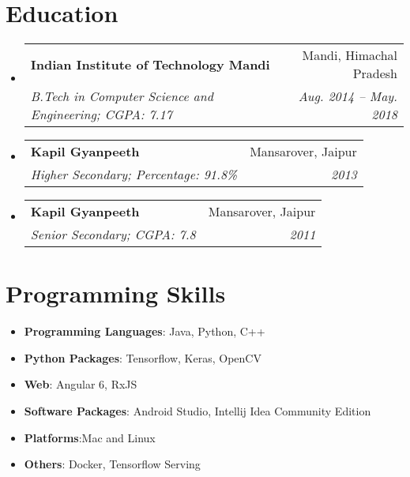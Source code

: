 \documentclass[letterpaper,11pt]{article}
\makeatletter
\newcommand{\resumeSubheading}[4]{
  \vspace{-1pt}\item
    \begin{tabular*}{0.97\textwidth}{l@{\extracolsep{\fill}}r}
      \textbf{#1} & #2 \\
      \textit{\small#3} & \textit{\small #4} \\
    \end{tabular*}\vspace{-5pt}
}
\newcommand{\resumeSubHeadingListStart}{\begin{itemize}[leftmargin=*]}
\newcommand{\resumeSubHeadingListEnd}{\end{itemize}}
\makeatother
\begin{document}
\section{Education}
  \resumeSubHeadingListStart
    \resumeSubheading
      {Indian Institute of Technology Mandi}{Mandi, Himachal Pradesh}
      {B.Tech in Computer Science and Engineering;  CGPA: 7.17}{Aug. 2014 -- May. 2018}
    \resumeSubheading
      {Kapil Gyanpeeth}{Mansarover, Jaipur}
      {Higher Secondary;  Percentage: 91.8\% }{2013}
    \resumeSubheading
      {Kapil Gyanpeeth}{Mansarover, Jaipur}
      {Senior Secondary;  CGPA: 7.8 }{2011}
  \resumeSubHeadingListEnd
  
\section{Programming Skills}
 \resumeSubHeadingListStart
    \item{
     \textbf{Programming Languages}{: Java, Python, C++}
     \hfill
    }
    \item{
      \textbf{Python Packages}{: Tensorflow, Keras, OpenCV}
      \hfill
    }
    \item{
       \textbf{Web}{: Angular 6, RxJS}
      \hfill
    }
    \item{
      \textbf{Software Packages}{: Android Studio, Intellij Idea Community Edition}
      \hfill
    }
    \item{
      \textbf{Platforms}{:Mac and Linux}
      \hfill
    }
    \item{
    \textbf{Others}{: Docker, Tensorflow Serving}
   }
 \resumeSubHeadingListEnd








\end{document}

